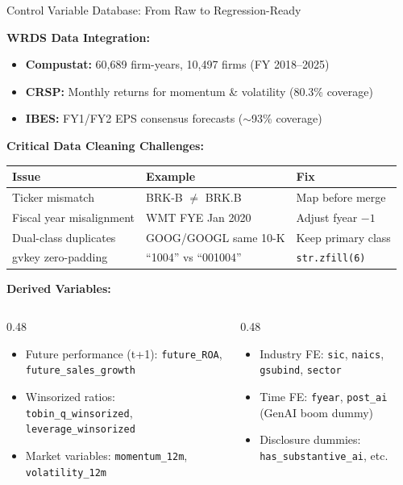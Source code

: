 \documentclass[aspectratio=169]{beamer}
\begin{document}
\begin{frame}{Control Variable Database: From Raw to Regression-Ready}

\textbf{WRDS Data Integration:}
\begin{itemize}
    \item \textbf{Compustat:} 60,689 firm-years, 10,497 firms (FY 2018--2025)
    \item \textbf{CRSP:} Monthly returns for momentum \& volatility (80.3\% coverage)
    \item \textbf{IBES:} FY1/FY2 EPS consensus forecasts ($\sim$93\% coverage)
\end{itemize}

\vspace{0.2cm}
\textbf{Critical Data Cleaning Challenges:}
\begin{table}
\centering
\small
\begin{tabular}{@{}lll@{}}
\toprule
\textbf{Issue} & \textbf{Example} & \textbf{Fix} \\
\midrule
Ticker mismatch & BRK-B $\neq$ BRK.B & Map before merge \\
Fiscal year misalignment & WMT FYE Jan 2020 & Adjust fyear $-1$ \\
Dual-class duplicates & GOOG/GOOGL same 10-K & Keep primary class \\
gvkey zero-padding & ``1004'' vs ``001004'' & \texttt{str.zfill(6)} \\
\bottomrule
\end{tabular}
\end{table}

\vspace{0.2cm}
\textbf{Derived Variables:}
\begin{columns}[T]
\begin{column}{0.48\textwidth}
\begin{itemize}
    \item Future performance (t+1): \texttt{future\_ROA}, \texttt{future\_sales\_growth}
    \item Winsorized ratios: \texttt{tobin\_q\_winsorized}, \texttt{leverage\_winsorized}
    \item Market variables: \texttt{momentum\_12m}, \texttt{volatility\_12m}
\end{itemize}
\end{column}
\begin{column}{0.48\textwidth}
\begin{itemize}
    \item Industry FE: \texttt{sic}, \texttt{naics}, \texttt{gsubind}, \texttt{sector}
    \item Time FE: \texttt{fyear}, \texttt{post\_ai} (GenAI boom dummy)
    \item Disclosure dummies: \texttt{has\_substantive\_ai}, etc.
\end{itemize}
\end{column}
\end{columns}

\end{frame}
\end{document}
